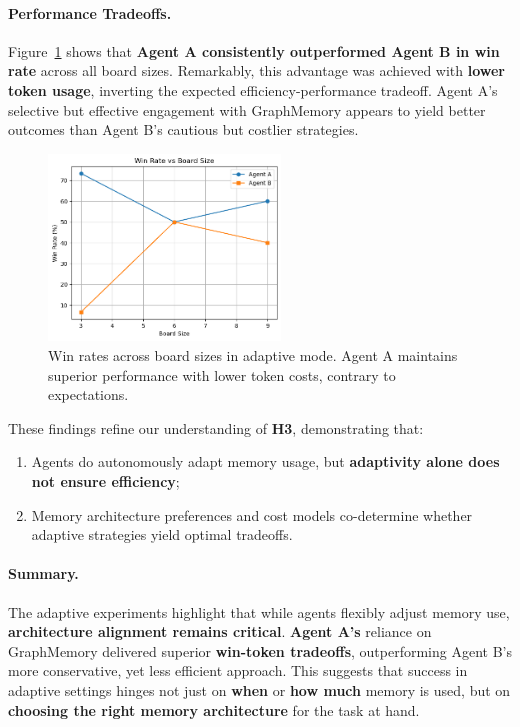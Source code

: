 \documentclass[10pt]{article}
\begin{document}
\paragraph{Performance Tradeoffs.}
Figure~\ref{fig:adaptive_win_rate} shows that \textbf{Agent A consistently outperformed Agent B in win rate} across all board sizes. Remarkably, this advantage was achieved with \textbf{lower token usage}, inverting the expected efficiency-performance tradeoff. Agent A's selective but effective engagement with GraphMemory appears to yield better outcomes than Agent B's cautious but costlier strategies.

\begin{figure}[ht]
\centering
\includegraphics[width=0.55\textwidth]{figures/adaptive/win_rate_vs_board_size.png}
\caption{Win rates across board sizes in adaptive mode. Agent A maintains superior performance with lower token costs, contrary to expectations.}
\label{fig:adaptive_win_rate}
\end{figure}

These findings refine our understanding of \textbf{H3}, demonstrating that:
\begin{enumerate}[leftmargin=*,nosep]
\item Agents do autonomously adapt memory usage, but \textbf{adaptivity alone does not ensure efficiency};
\item Memory architecture preferences and cost models co-determine whether adaptive strategies yield optimal tradeoffs.
\end{enumerate}

\paragraph{Summary.}
The adaptive experiments highlight that while agents flexibly adjust memory use, \textbf{architecture alignment remains critical}. \textbf{Agent A's} reliance on GraphMemory delivered superior \textbf{win-token tradeoffs}, outperforming Agent B's more conservative, yet less efficient approach. This suggests that success in adaptive settings hinges not just on \textbf{when} or \textbf{how much} memory is used, but on \textbf{choosing the right memory architecture} for the task at hand.
\end{document}
